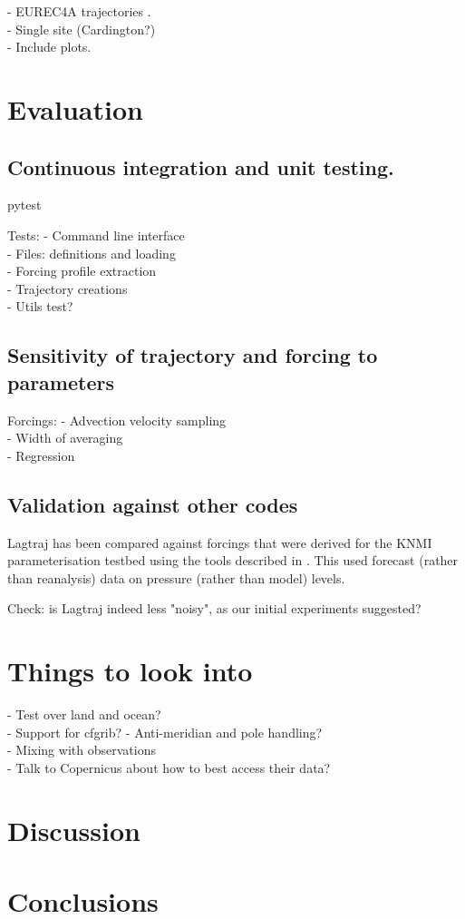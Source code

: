 \documentclass[a4paper,11pt]{article}
\begin{document}
- EUREC4A trajectories \cite{bony2017}. \\
- Single site (Cardington?) \\
- Include plots.

\section{Evaluation}\label{sec:evaluation}

\subsection{Continuous integration and unit testing.}

pytest \citep{okken2017}

Tests:
- Command line interface \\
- Files: definitions and loading \\
- Forcing profile extraction \\
- Trajectory creations \\
- Utils test?

\subsection{Sensitivity of trajectory and forcing to parameters}

Forcings:
- Advection velocity sampling \\
- Width of averaging \\
- Regression

\subsection{Validation against other codes}

Lagtraj has been compared against forcings that were derived for the
KNMI parameterisation testbed using the tools described in . This used
forecast (rather than reanalysis) data on pressure (rather than model)
levels.

Check: is Lagtraj indeed less "noisy", as our initial
experiments suggested?

\section*{Things to look into}

- Test over land and ocean? \\
- Support for cfgrib?
- Anti-meridian and pole handling? \\
- Mixing with observations \\
- Talk to Copernicus about how to best access their data? \\

\section{Discussion}

\section{Conclusions}



\end{document}
